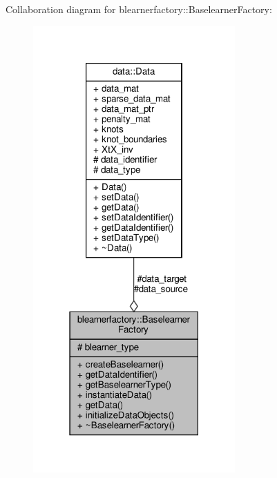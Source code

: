 Collaboration diagram for blearnerfactory\+:\+:Baselearner\+Factory\+:
\nopagebreak
\begin{figure}[H]
\begin{center}
\leavevmode
\includegraphics[width=219pt]{classblearnerfactory_1_1_baselearner_factory__coll__graph}
\end{center}
\end{figure}
